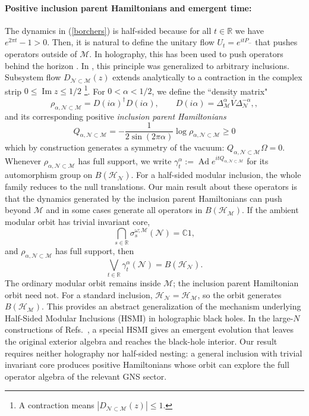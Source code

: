 \documentclass[a4paper,11pt]{article}
\theoremstyle{definition}
\newcommand{\mN}{\mathcal{N}}
\newcommand{\mH}{\mathcal{H}}
\newcommand{\mM}{\mathcal{M}}
\begin{document}
\paragraph{Positive inclusion parent Hamiltonians and emergent time:} The dynamics in (\ref{borchers}) is half-sided because for all $t\in\mathbb{R}$ we have $e^{2\pi t}-1>0$. Then, it is natural to define the unitary flow $U_t=e^{i t P_-}$ that pushes operators outside of $\mM$. In holography, this has been used to push operators behind the horizon \cite{LeutheusserLiuCausal}. In \cite{chen2026local}, this principle was generalized to arbitrary inclusions. Subsystem flow $D_{\mN\subset\mM}(z)$ extends analytically to a contraction in the complex strip $0\leq\operatorname{Im}z\leq1/2$ \footnote{A contraction means $|D_{\mN\subset\mM}(z)|\leq 1$.}.
For $0<\alpha<1/2$, we define the ``density matrix"
\begin{equation}
\rho_{\alpha,\mN\subset\mM}=D(i\alpha)^\dagger D(i\alpha),\qquad    D(i\alpha)
    =
    \overline{\Delta_{\mM}^\alpha V\Delta_{\mN}^{-\alpha}},
    ,
\end{equation}
and its corresponding positive {\it inclusion parent Hamiltonians} 
\begin{equation}
    Q_{\alpha,\mN\subset\mM}
    =
    -\frac{1}{2\sin(2\pi\alpha)}
    \log\rho_{\alpha,\mN\subset\mM}\geq 0
    \label{eq:intro-Halpha}
\end{equation}
which by construction generates a symmetry of the vacuum:
$Q_{\alpha,\mN\subset\mM}\Omega=0$.
Whenever $\rho_{\alpha,\mN\subset\mM}$ has full support, we write
$\gamma_t^\alpha:=\operatorname{Ad}e^{itQ_{\alpha,\mN\subset\mM}}$
for its automorphism group on $B(\mH_{\mN})$.
For a half-sided modular inclusion, the whole family reduces to the null translations.
Our main result about these operators is that the dynamics generated by the inclusion parent Hamiltonians can push beyond $\mM$ and in some cases generate all operators in $B(\mH_{\mM})$.  If the ambient modular orbit has trivial invariant core,
\begin{equation}
    \bigcap_{s\in\mathbb R}
    \sigma_s^{\omega;\mM}(\mN)
    =
    \mathbb C1,
\end{equation}
and $\rho_{\alpha,\mN\subset\mM}$ has full support, then
\begin{equation}
    \bigvee_{t\in\mathbb R}
    \gamma_t^\alpha(\mN)
    =
    B(\mH_{\mN}).
    \label{eq:intro-full-generation}
\end{equation}
The ordinary modular orbit remains inside $\mM$; the inclusion parent Hamiltonian orbit need not.  For a standard inclusion, $\mH_{\mN}=\mH_{\mM}$, so the orbit generates $B(\mH_{\mM})$. This provides an abstract generalization of the mechanism underlying Half-Sided Modular Inclusions (HSMI) in holographic black holes.  In the large-$N$ constructions of Refs.~\cite{LeutheusserLiuCausal,LeutheusserLiu2023,LeutheusserLiuSubregion}, a special HSMI gives an emergent evolution that leaves the original exterior algebra and reaches the black-hole interior.  Our result requires neither holography nor half-sided nesting: a general inclusion with trivial invariant core produces positive Hamiltonians whose orbit can explore the full operator algebra of the relevant GNS sector.  
\end{document}

